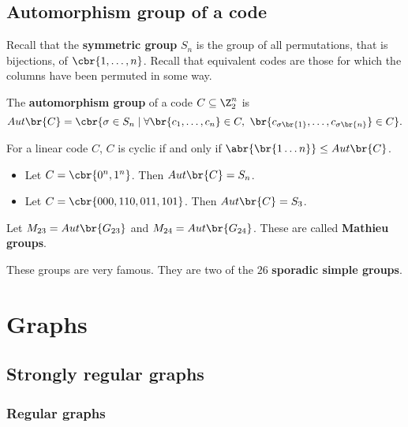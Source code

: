 \subsection{Automorphism group of a code}

Recall that the \textbf{symmetric group} $ S_n $ is the group of all permutations, that is bijections, of $ \cbr{1, \dots, n} $. Recall that equivalent codes are those for which the columns have been permuted in some way.

\begin{definition*}
The \textbf{automorphism group} of a code $ C \subseteq \Z_2^n $ is
$$ Aut\br{C} = \cbr{\sigma \in S_n \mid \forall \br{c_1, \dots, c_n} \in C, \ \br{c_{\sigma\br{1}}, \dots, c_{\sigma\br{n}}} \in C}. $$
\end{definition*}

\begin{remark*}
For a linear code $ C $, $ C $ is cyclic if and only if $ \abr{\br{1 \dots n}} \le Aut\br{C} $.
\end{remark*}

\begin{example*}
\hfill
\begin{itemize}
\item Let $ C = \cbr{0^n, 1^n} $. Then $ Aut\br{C} = S_n $.
\item Let $ C = \cbr{000, 110, 011, 101} $. Then $ Aut\br{C} = S_3 $.
\end{itemize}
\end{example*}

\begin{definition*}
Let $ M_{23} = Aut\br{G_{23}} $ and $ M_{24} = Aut\br{G_{24}} $. These are called \textbf{Mathieu groups}.
\end{definition*}

These groups are very famous. They are two of the $ 26 $ \textbf{sporadic simple groups}.

\pagebreak

\section{Graphs}


\subsection{Strongly regular graphs}

\subsubsection{Regular graphs}

